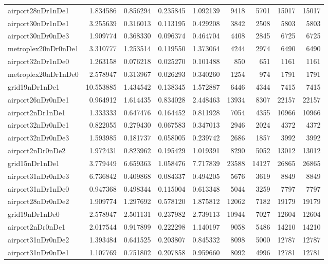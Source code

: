 \begin{longtable}{|l|r|r|r|r|r|r|r|r|}
airport28nDr1nDe1 & 1.834586 & 0.856294 & 0.235845 & 1.092139 & 9418 & 5701 & 15017 & 15017 \\
airport30nDr1nDe1 & 3.255639 & 0.316013 & 0.113195 & 0.429208 & 3842 & 2508 & 5803 & 5803 \\
airport30nDr0nDe3 & 1.909774 & 0.368330 & 0.096374 & 0.464704 & 4408 & 2845 & 6725 & 6725 \\
metroplex20nDr0nDe1 & 3.310777 & 1.253514 & 0.119550 & 1.373064 & 4244 & 2974 & 6490 & 6490 \\
airport32nDr1nDe0 & 1.263158 & 0.076218 & 0.025270 & 0.101488 & 850 & 651 & 1161 & 1161 \\
metroplex20nDr1nDe0 & 2.578947 & 0.313967 & 0.026293 & 0.340260 & 1254 & 974 & 1791 & 1791 \\
grid19nDr1nDe1 & 10.553885 & 1.434542 & 0.138345 & 1.572887 & 6446 & 4344 & 7415 & 7415 \\
airport26nDr0nDe1 & 0.964912 & 1.614435 & 0.834028 & 2.448463 & 13934 & 8307 & 22157 & 22157 \\
airport2nDr1nDe1 & 1.333333 & 0.647476 & 0.164452 & 0.811928 & 7054 & 4355 & 10966 & 10966 \\
airport32nDr0nDe1 & 0.822055 & 0.279430 & 0.067583 & 0.347013 & 2946 & 2024 & 4372 & 4372 \\
airport32nDr0nDe3 & 1.593985 & 0.181737 & 0.058005 & 0.239742 & 2686 & 1857 & 3992 & 3992 \\
airport2nDr0nDe2 & 1.972431 & 0.823962 & 0.195429 & 1.019391 & 8290 & 5052 & 13012 & 13012 \\
grid15nDr1nDe1 & 3.779449 & 6.659363 & 1.058476 & 7.717839 & 23588 & 14127 & 26865 & 26865 \\
airport31nDr0nDe3 & 6.736842 & 0.409868 & 0.084337 & 0.494205 & 5676 & 3619 & 8849 & 8849 \\
airport31nDr1nDe0 & 0.947368 & 0.498344 & 0.115004 & 0.613348 & 5044 & 3259 & 7797 & 7797 \\
airport28nDr0nDe2 & 1.909774 & 1.297692 & 0.578120 & 1.875812 & 12062 & 7182 & 19179 & 19179 \\
grid19nDr1nDe0 & 2.578947 & 2.501131 & 0.237982 & 2.739113 & 10944 & 7027 & 12604 & 12604 \\
airport2nDr0nDe1 & 2.017544 & 0.917899 & 0.222298 & 1.140197 & 9058 & 5486 & 14210 & 14210 \\
airport31nDr0nDe2 & 1.393484 & 0.641525 & 0.203807 & 0.845332 & 8098 & 5000 & 12787 & 12787 \\
airport31nDr0nDe1 & 1.107769 & 0.751802 & 0.207858 & 0.959660 & 8092 & 4996 & 12781 & 12781 \\

\end{longtable}
